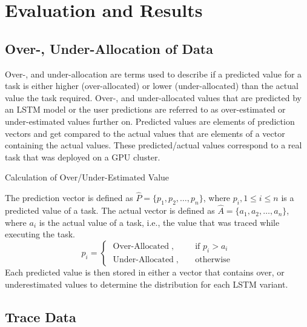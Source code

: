 \chapter{Evaluation and Results}
\label{ch:evaluation-and-results}


\section{Over-, Under-Allocation of Data}
\label{sec:over-under-allocation-of-data}

  Over-, and under-allocation are terms used to describe if a predicted value for a task is either higher (over-allocated) or lower (under-allocated) than the actual value the task required. Over-, and under-allocated values that are predicted by an LSTM model or the user predictions are referred to as over-estimated or under-estimated values further on.
  Predicted values are elements of prediction vectors and get compared to the actual values that are elements of a vector containing the actual values. These predicted/actual values correspond to a real task that was deployed on a GPU cluster.

  \begin{pabox}{Calculation of Over/Under-Estimated Value}
    \label{def:calculation-of-over-under-estimated-value}
  
      The prediction vector is defined as $\hat{P} = \{p_1, p_2, \dots, p_n\}$, where $p_i, 1 \leq i \leq n$ is a predicted value of a task. The actual vector is defined as $\hat{A} = \{a_1, a_2, \dots, a_n\}$, where $a_i$ is the actual value of a task, i.e., the value that was traced while executing the task.
      $$p_i = 
      \begin{cases}
        \operatorname{Over-Allocated}, & \quad \textrm{if } p_i > a_i \\
        \operatorname{Under-Allocated},  & \quad \textrm{otherwise}
      \end{cases}$$
      Each predicted value is then stored in either a vector that contains over, or underestimated values to determine the distribution for each LSTM variant.
  
    \end{pabox}

\section{Trace Data}
\label{sec:data-analysis-evaluation}

